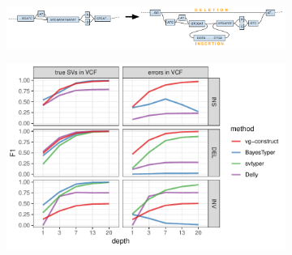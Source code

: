 \documentclass{article}
\begin{document}
\begin{figure}
  \begin{subfigure}[b]{\textwidth}
    \caption{}
    \includegraphics[width=\textwidth]{pdf/VGSVcartoon.pdf}
  \end{subfigure}

  \begin{subfigure}[b]{\textwidth}
    \caption{}
    \includegraphics[width=\textwidth]{pdf/simerror-geno.pdf}
  \end{subfigure}
\end{figure}
\end{document}
